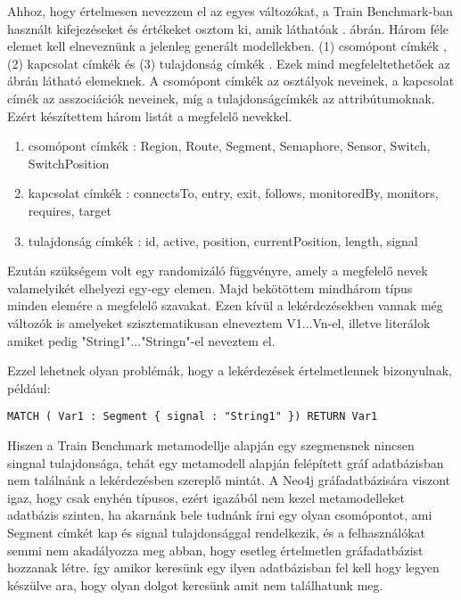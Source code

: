 Ahhoz, hogy értelmesen nevezzem el az egyes változókat, a Train Benchmark-ban használt kifejezéseket és értékeket osztom ki, amik láthatóak . ábrán. Három féle elemet kell elneveznünk a jelenleg generált modellekben. (1) csomópont címkék  , (2) kapcsolat címkék  és (3) tulajdonság címkék .
Ezek mind megfeleltethetőek az ábrán látható elemeknek. A csomópont címkék az osztályok neveinek, a kapcsolat címék az asszociációk neveinek, míg a tulajdonságcímkék az attribútumoknak. Ezért készítettem három listát a megfelelő nevekkel.
\begin{enumerate}
	\item csomópont címkék : Region, Route, Segment, Semaphore, Sensor, Switch, SwitchPosition
	\item kapcsolat címkék : connectsTo, entry, exit, follows, monitoredBy, monitors, requires, target
	\item tulajdonság címkék : id, active, position, currentPosition, length, signal
	
\end{enumerate}
Ezután szükségem volt egy randomizáló függvényre, amely a megfelelő nevek valamelyikét elhelyezi egy-egy elemen.
Majd bekötöttem mindhárom típus minden elemére a megfelelő szavakat. Ezen kívül a lekérdezésekben vannak még változók is amelyeket szisztematikusan elneveztem V1...Vn-el, illetve literálok amiket pedig "String1"..."Stringn"-el neveztem el. 

Ezzel lehetnek olyan problémák, hogy a lekérdezések értelmetlennek bizonyulnak, például:
 \begin{lstlisting}[style=cyphersmall]
 MATCH ( Var1 : Segment { signal : "String1" }) RETURN Var1
 \end{lstlisting}
 
 Hiszen a Train Benchmark metamodellje alapján egy szegmensnek nincsen singnal tulajdonsága, tehát egy metamodell alapján felépített gráf adatbázisban nem találnánk a lekérdezésben szereplő mintát. A Neo4j gráfadatbázisára viszont igaz, hogy csak enyhén típusos, ezért igazából nem kezel metamodelleket adatbázis szinten, ha akarnánk bele tudnánk írni egy olyan csomópontot, ami Segment címkét kap és signal tulajdonsággal rendelkezik, és a felhasználókat semmi nem akadályozza meg abban, hogy esetleg értelmetlen gráfadatbázist hozzanak létre. így amikor keresünk egy ilyen adatbázisban fel kell hogy legyen készülve ara, hogy olyan dolgot keresünk amit nem találhatunk meg. 

